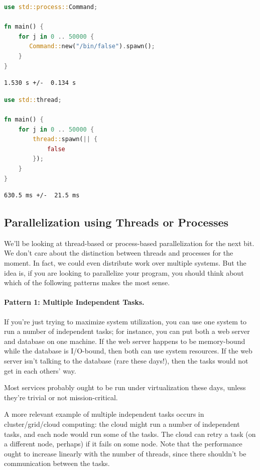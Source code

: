 \documentclass[a4paper]{report}
\begin{document}
\begin{multicols}{2}

\begin{lstlisting}[language=Rust]
use std::process::Command;

fn main() {
    for j in 0 .. 50000 {
       Command::new("/bin/false").spawn();
    }
}
\end{lstlisting}
\begin{verbatim}
1.530 s +/-  0.134 s
\end{verbatim}
\columnbreak
\begin{lstlisting}[language=Rust]
use std::thread;

fn main() {
    for j in 0 .. 50000 {
        thread::spawn(|| {
            false
        });
    }
}
\end{lstlisting}
\begin{verbatim}
630.5 ms +/-  21.5 ms 
\end{verbatim}

\end{multicols}

\subsection*{Parallelization using Threads or Processes}
We'll be looking at thread-based or process-based parallelization for the
next bit. We don't care about the distinction between threads and processes
for the moment. In fact, we could even distribute work over multiple systems. But the idea is, if you are looking to parallelize your program, you should think about which of the following patterns makes the most sense.

\paragraph{Pattern 1: Multiple Independent Tasks.} If you're just trying to maximize
system utilization, you can use one system to run a number of independent
tasks; for instance, you can put both a web server and database on
one machine. If the web server happens to be memory-bound while the
database is I/O-bound, then both can use system resources. If the web
server isn't talking to the database (rare these days!), then the tasks
would not get in each others' way.

Most services probably ought to be run under virtualization these
days, unless they're trivial or not mission-critical.

A more relevant example of multiple independent tasks occurs in
cluster/grid/cloud computing: the cloud might run a number of
independent tasks, and each node would run some of the tasks. The
cloud can retry a task (on a different node, perhaps) if it fails on
some node. Note that the performance ought to increase linearly with
the number of threads, since there shouldn't be communication between
the tasks.
\end{document}
